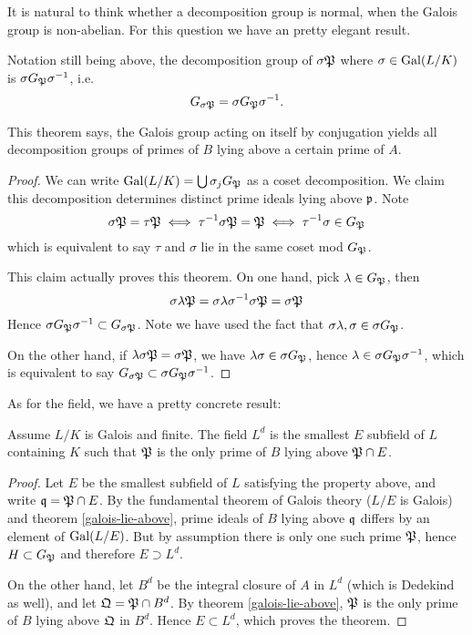 				It is natural to think whether a decomposition group is normal, when the Galois group is non-abelian. For this question we have an pretty elegant result. 
				
				\begin{theorem}
					Notation still being above, the decomposition group of $\sigma\mathfrak{P}$ where $\sigma \in \operatorname{Gal}(L/K)$ is $\sigma G_\mathfrak{P}\sigma^{-1}$, i.e.
					\[
						G_{\sigma\mathfrak{P}} = \sigma G_\mathfrak{P}\sigma^{-1}.
					\]
				\end{theorem}
				This theorem says, the Galois group acting on itself by conjugation yields all decomposition groups of primes of $B$ lying above a certain prime of $A$.
				\begin{proof}
					We can write $\operatorname{Gal}(L/K) = \bigcup\sigma_jG_\mathfrak{P}$ as a coset decomposition. We claim this decomposition determines distinct prime ideals lying above $\mathfrak{p}$. Note
					\[
						\sigma\mathfrak{P}=\tau\mathfrak{P} \iff \tau^{-1}\sigma\mathfrak{P}=\mathfrak{P} \iff \tau^{-1}\sigma \in G_\mathfrak{P}
					\]
					which is equivalent to say $\tau$ and $\sigma$ lie in the same coset mod $G_\mathfrak{P}$. 
					
					This claim actually proves this theorem. On one hand, pick $\lambda \in G_\mathfrak{P}$, then
					\[
						\sigma\lambda\mathfrak{P} = \sigma\lambda\sigma^{-1}\sigma\mathfrak{P} = \sigma\mathfrak{P}
					\]
					Hence $\sigma G_{\mathfrak{P}}\sigma^{-1} \subset G_{\sigma\mathfrak{P}}$. Note we have used the fact that $\sigma\lambda,\sigma \in \sigma G_\mathfrak{P}$. 
					
					On the other hand, if $\lambda\sigma\mathfrak{P} = \sigma\mathfrak{P}$, we have $\lambda\sigma \in \sigma G_\mathfrak{P}$, hence $\lambda \in \sigma G_\mathfrak{P}\sigma^{-1}$, which is equivalent to say $G_{\sigma\mathfrak{P}} \subset \sigma G_\mathfrak{P} \sigma^{-1}$.
				\end{proof}
			
				As for the field, we have a pretty concrete result:
					
				\begin{theorem}
					Assume $L/K$ is Galois and finite. The field $L^d$ is the smallest $E$ subfield of $L$ containing $K$ such that $\mathfrak{P}$ is the only prime of $B$ lying above $\mathfrak{P} \cap E$. 
				\end{theorem}
				\begin{proof}
					Let $E$ be the smallest subfield of $L$ satisfying the property above, and write $\mathfrak{q} = \mathfrak{P} \cap E$. By the fundamental theorem of Galois theory ($L/E$ is Galois) and theorem \ref{galois-lie-above}, prime ideals of $B$ lying above $\mathfrak{q}$ differs by an element of $\operatorname{Gal}(L/E)$. But by assumption there is only one such prime $\mathfrak{P}$, hence $H \subset G_\mathfrak{P}$ and therefore $E \supset L^d$.
					
					On the other hand, let $B^d$ be the integral closure of $A$ in $L^d$ (which is Dedekind as well), and let $\mathfrak{Q}=\mathfrak{P} \cap B^d$. By theorem \ref{galois-lie-above}, $\mathfrak{P}$ is the only prime of $B$ lying above $\mathfrak{Q}$ in $B^d$. Hence $E \subset L^d$, which proves the theorem.
				\end{proof}
				
